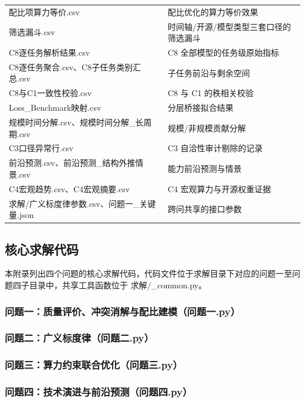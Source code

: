 \begin{longtable}{>{\raggedright\arraybackslash}p{}>{\raggedright\arraybackslash}p{}}
  配比项算力等价.csv & 配比优化的算力等价效果 \\
  筛选漏斗.csv & 时间轴/开源/模型类型三套口径的筛选漏斗 \\
  C8逐任务解析结果.csv & C8 全部模型的任务级原始指标 \\
  C8逐任务聚合.csv、C8子任务类别汇总.csv & 子任务前沿与剩余空间 \\
  C8与C1一致性校验.csv & C8 与 C1 的秩相关校验 \\
  Loss\_Benchmark映射.csv & 分层桥接拟合结果 \\
  规模时间分解.csv、规模时间分解\_长周期.csv & 规模/非规模贡献分解 \\
  C3口径异常行.csv & C3 自洽性审计剔除的记录 \\
  前沿预测.csv、前沿预测\_结构外推情景.csv & 能力前沿预测与情景 \\
  C4宏观趋势.csv、C4宏观摘要.csv & C4 宏观算力与开源权重证据 \\
  求解/广义标度律参数.csv、问题一\_关键量.json & 跨问共享的接口参数 \\
\end{longtable}

\newpage
\subsection*{核心求解代码}

本附录列出四个问题的核心求解代码，代码文件位于求解目录下对应的问题一至问题四子目录中，共享工具函数位于 求解/\_common.py。

\subsubsection*{问题一：质量评价、冲突消解与配比建模（问题一.py）}


\subsubsection*{问题二：广义标度律（问题二.py）}


\subsubsection*{问题三：算力约束联合优化（问题三.py）}


\subsubsection*{问题四：技术演进与前沿预测（问题四.py）}

